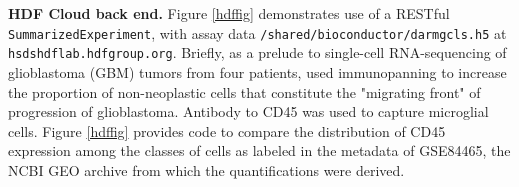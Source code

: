 \documentclass[applications]{gen-bioinformatics}
\newcommand{\Rpackage}[1]{{\textit{#1}}}
\begin{document}
\noindent
\textbf{HDF Cloud back end.}  Figure \ref{hdffig}
demonstrates use of a RESTful \texttt{SummarizedExperiment},
with assay data \texttt{/shared/bioconductor/darmgcls.h5}
at \texttt{hsdshdflab.hdfgroup.org}.  Briefly, as a
prelude to single-cell RNA-sequencing of glioblastoma (GBM)
tumors from four patients,
\cite{Darmanis2017} used immunopanning to increase the
proportion of non-neoplastic cells that constitute
the "migrating front" of progression of glioblastoma.
Antibody to CD45 was used to capture microglial cells.
Figure \ref{hdffig} provides code to compare
the distribution of CD45 expression among the
classes of
cells as labeled in the metadata of GSE84465,
the NCBI GEO archive from which the quantifications
were derived.  



\noindent
\end{document}
